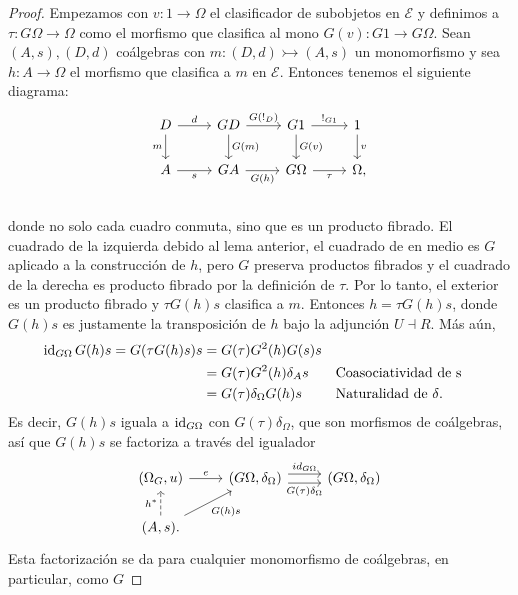 \begin{proof}
  Empezamos con $v\colon 1\to \Omega$ el clasificador de subobjetos en $\mathcal{E}$ y definimos a $\tau\colon G\Omega\to \Omega$
  como el morfismo que clasifica al mono $G(v)\colon G1\to G\Omega$. Sean $(A,s),(D,d)$ coálgebras con $m\colon (D,d)\rightarrowtail (A,s)$
  un monomorfismo y sea $h\colon A\to \Omega$ el morfismo que clasifica a $m$ en $\mathcal{E}$. Entonces
  tenemos el siguiente diagrama:
  \begin{equation*}
    \label{eq:clasificadorm}
    \begin{tikzcd}
      D\ar{r}{d}\ar[swap]{d}{m} & GD\ar{r}{G(!_D)}\ar{d}{G(m)} & G1\ar{r}{!_{G1}}\ar{d}{G(v)} & 1\ar{d}{v} \\
      A\ar[swap]{r}{s} & GA\ar[swap]{r}{G(h)} & G\Omega\ar[swap]{r}{\tau} & \Omega\mathrlap{,} \\
    \end{tikzcd}
  \end{equation*}
  donde no solo cada cuadro conmuta, sino que es un producto fibrado. El cuadrado de la izquierda debido
  al lema anterior, el cuadrado de en medio es $G$ aplicado a la construcción de $h$, pero $G$ preserva
  productos fibrados y el cuadrado de la derecha es producto fibrado por la definición de $\tau$.
  Por lo tanto, el exterior es un producto fibrado y $\tau G(h)s$ clasifica a $m$. Entonces $h=\tau G(h)s$,
  donde $G(h)s$ es justamente la transposición de $h$ bajo la adjunción $U\dashv R$. Más aún,
  \begin{align*}
    \operatorname{id}_{G\Omega}G(h)s = G(\tau G(h)s) s &= G(\tau)G^2(h)G(s)s \\
    &=G(\tau)G^2(h)\delta_A s  && \text{Coasociatividad de s} \\
    &=G(\tau)\delta_{\Omega}G(h)s && \text{Naturalidad de $\delta$}.
  \end{align*}
  Es decir, $G(h)s$ iguala a $\operatorname{id}_{G\Omega}$ con $G(\tau)\delta_{\Omega}$, que son morfismos de coálgebras,
  así que $G(h)s$ se factoriza a través del igualador
  \begin{equation*}
    \begin{tikzcd}
      (\Omega_G,u)\ar{r}{e} & (G\Omega,\delta_{\Omega})\ar[shift left=0.75ex]{r}{id_{G\Omega}}\ar[swap, shift right=0.75ex]{r}{G(\tau)\delta_{\Omega}} & (G\Omega,\delta_{\Omega}) \\
      (A,s).\ar[dashed]{u}{h^*}\ar[swap]{ru}{G(h)s}
    \end{tikzcd}
  \end{equation*}
  Esta factorización se da para cualquier monomorfismo de coálgebras, en particular, como $G$

\end{proof}
